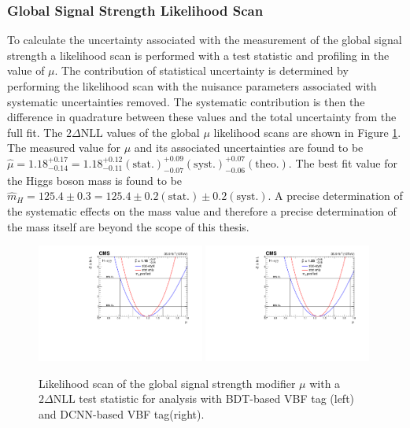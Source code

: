 \subsubsection{Global Signal Strength Likelihood Scan}
To calculate the uncertainty associated with the measurement of the global signal strength a likelihood scan is performed with a test statistic and profiling in the value of $\mu$.
The contribution of statistical uncertainty is determined by performing the likelihood scan with the nuisance parameters associated with systematic uncertainties removed. 
The systematic contribution is then the difference in quadrature between these values and the total uncertainty from the full fit. 
The $2\Delta{\mathrm{NLL}}$ values of the global $\mu$ likelihood scans are shown in Figure \ref{fig:stats_results:global_mu_scan}.
The measured value for $\mu$ and its associated uncertainties are found to be $\hat{\mu} = 1.18^{+0.17}_{-0.14} = 1.18^{+0.12}_{-0.11}(\mathrm{stat.})^{+0.09}_{-0.07}(\mathrm{syst.})^{+0.07}_{-0.06}(\mathrm{theo.})$.
The best fit value for the Higgs boson mass is found to be $\hat{m}_{H}=125.4\pm{0.3}=125.4\pm{0.2}(\mathrm{stat}.)\pm{0.2}(\mathrm{syst}.)$. 
A precise determination of the systematic effects on the mass value and therefore a precise determination of the mass itself are beyond the scope of this thesis.
\begin{figure}[h!]
    \begin{center}
        \includegraphics[width=0.49\textwidth]{figures/stats_results/CMS-HIG-16-040_Figure_016.pdf}
        \includegraphics[width=0.49\textwidth]{figures/stats_results/MuScanProfileMH.pdf}
    \end{center}
    \caption{Likelihood scan of the global signal strength modifier $\mu$ with a $2\Delta{\mathrm{NLL}}$ test statistic for analysis with BDT-based VBF tag (left) and DCNN-based VBF tag(right).}
        \label{fig:stats_results:global_mu_scan}
\end{figure}

